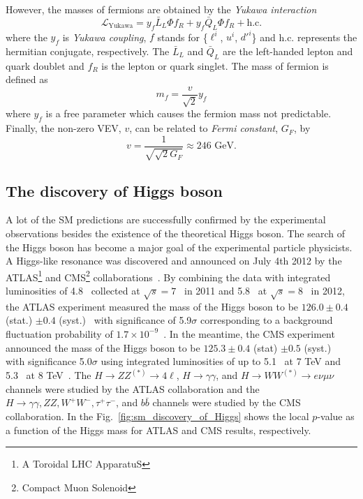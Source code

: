 %
However, the masses of fermions are obtained by the \textit{Yukawa interaction}
%
\begin{equation}
    \mathcal{L}_{\textrm{Yukawa}} = y_{f} \bar{L}_{L} \Phi f_{R} + y_{f} \bar{Q}_{L} \Phi f_{R} + \textrm{h.c.}
\end{equation}
%
where the $y_{f}$ is \textit{Yukawa coupling}, $f$ stands for \{$\ell^{i}$, $u^{i}$, $d'^{i}$\} and h.c. represents the hermitian conjugate, respectively.
The $\bar{L}_{L}$ and $\bar{Q}_{L}$ are the left-handed lepton and quark doublet and $f_{R}$ is the lepton or quark singlet.
The mass of fermion is defined as
%
\begin{equation}
    m_{f} = \frac{v}{\sqrt{2}}y_{f}
\end{equation}
%
where $y_{f}$ is a free parameter which causes the fermion mass not predictable.
Finally, the non-zero VEV, $v$, can be related to \textit{Fermi constant}, $G_{F}$, by
%
\begin{equation}
    v = \frac{1}{\sqrt{\sqrt{2} G_{F}}} \approx 246 \textrm{~{GeV}}.
\end{equation}
%


\subsection{The discovery of Higgs boson}
A lot of the SM predictions are successfully confirmed by the experimental observations besides the existence of the theoretical Higgs boson. 
The search of the Higgs boson has become a major goal of the experimental particle physicists.
A Higgs-like resonance was discovered and announced on July 4th 2012 by the ATLAS\footnote{A Toroidal LHC ApparatuS} and CMS\footnote{Compact Muon Solenoid} collaborations~\cite{Aad:2012tfa, Chatrchyan:2012xdj}.
By combining the data with integrated luminosities of 4.8~{\ifb} collected at $\sqrt{s} = 7$~{\TeV} in 2011 and 5.8~{\ifb} at $\sqrt{s}=8$~{\TeV} in 2012, the ATLAS experiment measured the mass of the Higgs boson to be $126.0 \pm 0.4$ (stat.) $\pm 0.4$ (syst.)~{\GeV} with significance of 5.9$\sigma$ corresponding to a background fluctuation probability of $1.7 \times 10^{-9}$~\cite{Aad:2012tfa}.
In the meantime, the CMS experiment announced the mass of the Higgs boson to be $125.3 \pm 0.4$ (stat) $\pm 0.5$ (syst.)~{\GeV} with significance 5.0$\sigma$ using integrated luminosities of up to 5.1~{\ifb} at 7 TeV and 5.3~{\ifb} at 8 TeV~\cite{Chatrchyan:2012xdj}. 
The $H \rightarrow ZZ^{(*)} \rightarrow 4\ell$, $H \rightarrow \gamma \gamma$, and $H \rightarrow WW^{(*)} \rightarrow e\nu\mu\nu$ channels were studied by the ATLAS collaboration and the $H \rightarrow \gamma \gamma, ZZ, W^{+}W^{-}, \tau^{+}\tau^{-}$, and $b\bar{b}$ channels were studied by the CMS collaboration.
In the Fig.~\ref{fig:sm_discovery_of_Higgs} shows the local $p$-value as a function of the Higgs mass for ATLAS and CMS results, respectively.

